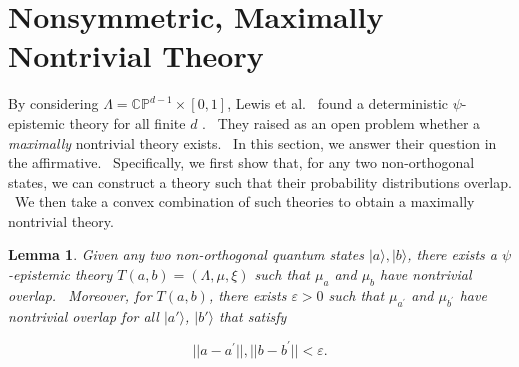 \documentclass[letterpaper,12pt]{article}
\newtheorem{lem}{Lemma}
\begin{document}
\section{Nonsymmetric, Maximally Nontrivial Theory}

By considering $\Lambda = \mathbb{CP}^{d-1} \times [0,1]$, Lewis et al.\ \cite{lewis}
found a deterministic $\psi$-epistemic theory for all finite $d$%
. \ They raised as an open problem whether a \emph{maximally} nontrivial
theory exists. \ In this section, we answer their question in the
affirmative. \ Specifically, we first show
that, for any two non-orthogonal states, we can construct a theory such that
their probability distributions overlap. \ We then take a convex combination
of such theories to obtain a maximally nontrivial theory.

\begin{lem}
\label{mix} Given any two non-orthogonal quantum states $ | a
\rangle, | b \rangle $, there exists a $\psi$-epistemic
theory $T(a,b)=(\Lambda,\mu,\xi)$ such that $\mu_a$ and $%
\mu_b$ have nontrivial overlap. \ Moreover, for $T(a,b)$, there
exists $\varepsilon>0$ such that $\mu_{a^{\prime }}$ and $\mu_{b^{\prime
}}$ have nontrivial overlap for all $ | a' \rangle $, $
| b' \rangle $ that satisfy

\[ ||a-a^{\prime }||,||b-b^{\prime
}||<\varepsilon. \]
\end{lem}
\end{document}
